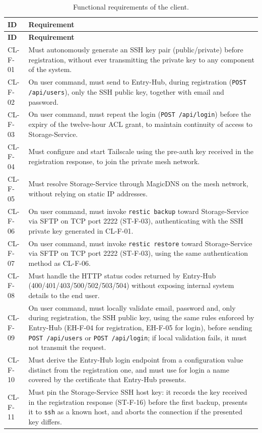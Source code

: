 \begin{longtable}{p{2.6cm} p{\dimexpr\linewidth-2.6cm-4\tabcolsep\relax}}
\caption{Functional requirements of the client.} \\
\hline
\textbf{ID} & \textbf{Requirement} \\
\hline
\endfirsthead
\hline
\textbf{ID} & \textbf{Requirement} \\
\hline
\endhead
\hline
\endfoot
\hline
\endlastfoot
CL-F-01 & Must autonomously generate an SSH key pair (public/private) before registration, without ever transmitting the private key to any component of the system. \\
CL-F-02 & On user command, must send to Entry-Hub, during registration (\texttt{POST /api/users}), only the SSH public key, together with email and password. \\
CL-F-03 & On user command, must repeat the login (\texttt{POST /api/login}) before the expiry of the twelve-hour ACL grant, to maintain continuity of access to Storage-Service. \\
CL-F-04 & Must configure and start Tailscale using the pre-auth key received in the registration response, to join the private mesh network. \\
CL-F-05 & Must resolve Storage-Service through MagicDNS on the mesh network, without relying on static IP addresses. \\
CL-F-06 & On user command, must invoke \texttt{restic backup} toward Storage-Service via SFTP on TCP port 2222 (ST-F-03), authenticating with the SSH private key generated in CL-F-01. \\
CL-F-07 & On user command, must invoke \texttt{restic restore} toward Storage-Service via SFTP on TCP port 2222 (ST-F-03), using the same authentication method as CL-F-06. \\
CL-F-08 & Must handle the HTTP status codes returned by Entry-Hub (400/401/403/500/502/503/504) without exposing internal system details to the end user. \\
CL-F-09 & On user command, must locally validate email, password and, only during registration, the SSH public key, using the same rules enforced by Entry-Hub (EH-F-04 for registration, EH-F-05 for login), before sending \texttt{POST /api/users} or \texttt{POST /api/login}; if local validation fails, it must not transmit the request. \\
CL-F-10 & Must derive the Entry-Hub login endpoint from a configuration value distinct from the registration one, and must use for login a name covered by the certificate that Entry-Hub presents. \\
CL-F-11 & Must pin the Storage-Service SSH host key: it records the key received in the registration response (ST-F-16) before the first backup, presents it to \texttt{ssh} as a known host, and aborts the connection if the presented key differs. \\
\end{longtable}

